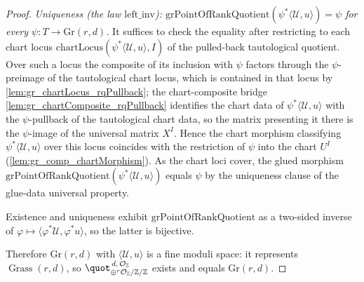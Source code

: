 \begin{proof}
  \emph{Uniqueness (the law \(\mathrm{left\_inv}\)):
  \(\mathrm{grPointOfRankQuotient}(\psi^{*}\langle \mathcal{U}, u\rangle) = \psi\)
  for every \(\psi : T \to \mathrm{Gr}(r,d)\).} It suffices to check the equality
  after restricting to each chart locus
  \(\mathrm{chartLocus}(\psi^{*}\langle \mathcal{U}, u\rangle, I)\) of the
  pulled-back tautological quotient. Over such a locus the composite of its
  inclusion with \(\psi\) factors through the \(\psi\)-preimage of the tautological
  chart locus, which is contained in that locus by
  \cref{lem:gr_chartLocus_rqPullback}; the chart-composite bridge
  \cref{lem:gr_chartComposite_rqPullback} identifies the chart data of
  \(\psi^{*}\langle \mathcal{U}, u\rangle\) with the \(\psi\)-pullback of the
  tautological chart data, so the matrix presenting it there is the \(\psi\)-image
  of the universal matrix \(X^I\). Hence the chart morphism classifying
  \(\psi^{*}\langle \mathcal{U}, u\rangle\) over this locus coincides with the
  restriction of \(\psi\) into the chart \(U^I\) (\cref{lem:gr_comp_chartMorphism}).
  As the chart loci cover, the glued morphism
  \(\mathrm{grPointOfRankQuotient}(\psi^{*}\langle \mathcal{U}, u\rangle)\) equals
  \(\psi\) by the uniqueness clause of the glue-data universal property.

  Existence and uniqueness exhibit \(\mathrm{grPointOfRankQuotient}\) as a two-sided
  inverse of \(\varphi \mapsto \langle \varphi^{*}\mathcal{U}, \varphi^{*}u\rangle\),
  so the latter is bijective.

  Therefore \(\mathrm{Gr}(r,d)\) with \(\langle \mathcal{U}, u \rangle\) is a fine
  moduli space: it represents \(\operatorname{Grass}(r,d)\), so
  \(\quot^{\,d,\,\mathcal{O}_{\mathbb{Z}}}_{\oplus^{r}\mathcal{O}_{\mathbb{Z}}/
  \mathbb{Z}/\mathbb{Z}}\) exists and equals \(\mathrm{Gr}(r,d)\).
\end{proof}
